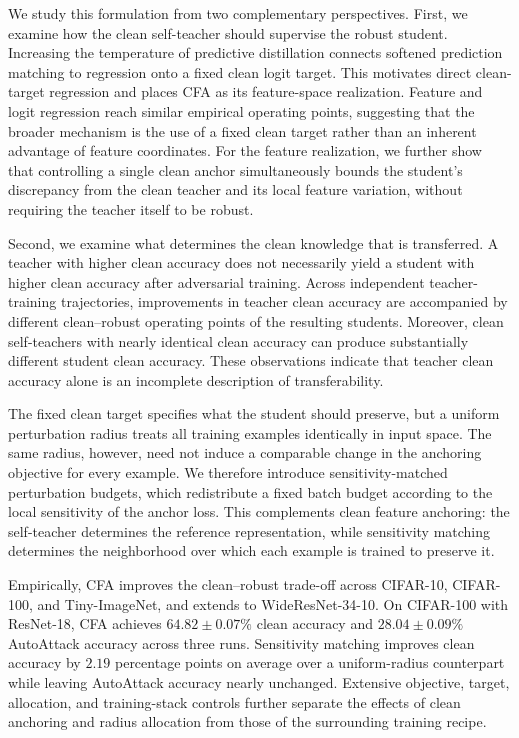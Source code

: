 We study this formulation from two complementary perspectives.
First, we examine how the clean self-teacher should supervise the robust
student.
Increasing the temperature of predictive distillation connects softened
prediction matching to regression onto a fixed clean logit target.
This motivates direct clean-target regression and places CFA as its
feature-space realization.
Feature and logit regression reach similar empirical operating points,
suggesting that the broader mechanism is the use of a fixed clean target
rather than an inherent advantage of feature coordinates.
For the feature realization, we further show that controlling a single
clean anchor simultaneously bounds the student's discrepancy from the clean
teacher and its local feature variation, without requiring the teacher itself
to be robust.

Second, we examine what determines the clean knowledge that is transferred.
A teacher with higher clean accuracy does not necessarily yield a student
with higher clean accuracy after adversarial training.
Across independent teacher-training trajectories, improvements in teacher
clean accuracy are accompanied by different clean--robust operating points
of the resulting students.
Moreover, clean self-teachers with nearly identical clean accuracy can
produce substantially different student clean accuracy.
These observations indicate that teacher clean accuracy alone is an
incomplete description of transferability.

The fixed clean target specifies what the student should preserve, but a
uniform perturbation radius treats all training examples identically in input
space.
The same radius, however, need not induce a comparable change in the
anchoring objective for every example.
We therefore introduce sensitivity-matched perturbation budgets, which
redistribute a fixed batch budget according to the local sensitivity of the
anchor loss.
This complements clean feature anchoring: the self-teacher determines the
reference representation, while sensitivity matching determines the
neighborhood over which each example is trained to preserve it.

Empirically, CFA improves the clean--robust trade-off across CIFAR-10,
CIFAR-100, and Tiny-ImageNet, and extends to WideResNet-34-10.
On CIFAR-100 with ResNet-18, CFA achieves
\(64.82\mathbin{\pm}0.07\%\) clean accuracy and
\(28.04\mathbin{\pm}0.09\%\) AutoAttack accuracy across three runs.
Sensitivity matching improves clean accuracy by \(2.19\) percentage points
on average over a uniform-radius counterpart while leaving AutoAttack
accuracy nearly unchanged.
Extensive objective, target, allocation, and training-stack controls further
separate the effects of clean anchoring and radius allocation from those of
the surrounding training recipe.

